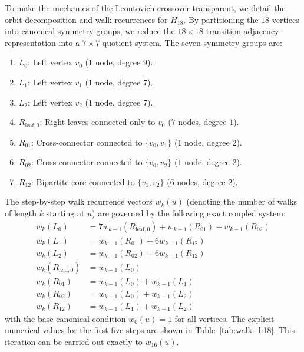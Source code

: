 To make the mechanics of the Leontovich crossover transparent, we detail the
orbit decomposition and walk recurrences for $H_{18}$.
By partitioning the $18$ vertices into canonical symmetry groups, we reduce the
$18 \times 18$ transition adjacency representation into a $7 \times 7$ quotient system. The seven symmetry groups are:
\begin{enumerate}
  \item $L_0$: Left vertex $v_0$ ($1$ node, degree $9$).
  \item $L_1$: Left vertex $v_1$ ($1$ node, degree $7$).
  \item $L_2$: Left vertex $v_2$ ($1$ node, degree $7$).
  \item $R_{\mathrm{leaf},0}$: Right leaves connected only to $v_0$ ($7$ nodes, degree $1$).
  \item $R_{01}$: Cross-connector connected to $\{v_0, v_1\}$ ($1$ node, degree $2$).
  \item $R_{02}$: Cross-connector connected to $\{v_0, v_2\}$ ($1$ node, degree $2$).
  \item $R_{12}$: Bipartite core connected to $\{v_1, v_2\}$ ($6$ nodes, degree $2$).
\end{enumerate}

The step-by-step walk recurrence vectors $w_k(u)$ (denoting the number of walks of length $k$ starting at $u$)
are governed by the following exact coupled system:
\begin{align*}
  w_k(L_0) &= 7 w_{k-1}(R_{\mathrm{leaf},0}) + w_{k-1}(R_{01}) + w_{k-1}(R_{02}) \\
  w_k(L_1) &= w_{k-1}(R_{01}) + 6 w_{k-1}(R_{12}) \\
  w_k(L_2) &= w_{k-1}(R_{02}) + 6 w_{k-1}(R_{12}) \\
  w_k(R_{\mathrm{leaf},0}) &= w_{k-1}(L_0) \\
  w_k(R_{01}) &= w_{k-1}(L_0) + w_{k-1}(L_1) \\
  w_k(R_{02}) &= w_{k-1}(L_0) + w_{k-1}(L_2) \\
  w_k(R_{12}) &= w_{k-1}(L_1) + w_{k-1}(L_2)
\end{align*}
with the base canonical condition $w_0(u) = 1$ for all vertices. The explicit numerical values for the
first five steps are shown in Table~\ref{tab:walk_h18}. This iteration can be carried out exactly to $w_{16}(u)$.

